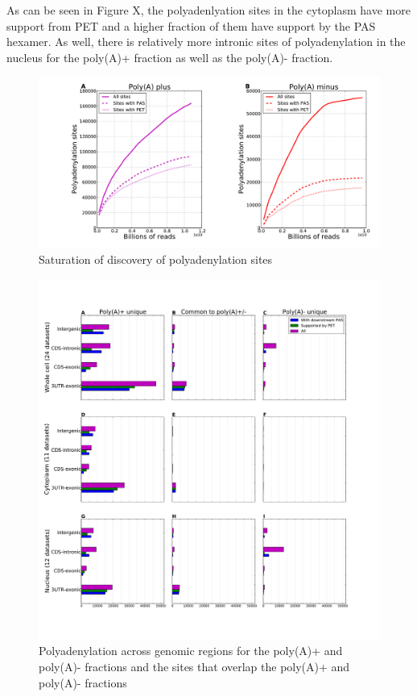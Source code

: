 As can be seen in Figure X, the polyadenlyation sites in the cytoplasm have
more support from PET and a higher fraction of them have support by the PAS
hexamer. As well, there is relatively more intronic sites of polyadenylation in
the nucleus for the poly(A)+ fraction as well as the poly(A)- fraction.

\begin{figure}[htb]
	\begin{center}
		\includegraphics[scale=0.3]{figures/polyadenylation/Saturation_plot_2+.pdf}
	\end{center}
	\caption{Saturation of discovery of polyadenylation sites}
	\label{fig:saturation}
\end{figure}

\begin{figure}[htb]
	\begin{center}
		\includegraphics[scale=0.3]{figures/polyadenylation/intersected_sidebars_pA_2+.pdf}
	\end{center}
	\caption{Polyadenylation across genomic regions for the poly(A)+ and poly(A)-
	fractions and the sites that overlap the poly(A)+ and poly(A)- fractions}
	\label{fig:sidebars_intersect}
\end{figure}

